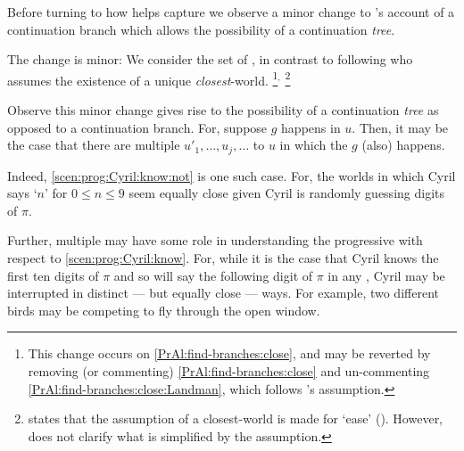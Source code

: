 \begin{note}
  Before turning to how \AlgFindBranches{} helps capture \drift{} we observe a minor change to \citeauthor{Landman:1992wh}'s account of a continuation branch which allows the possibility of a continuation \emph{tree}.

  The change is minor:
  We consider the set of , in contrast to following \citeauthor{Landman:1992wh} who assumes the existence of a unique \emph{closest}-world.%
  \footnote{
    This change occurs on \autoref{PrAl:find-branches:close}, and may be reverted by removing (or commenting) \autoref{PrAl:find-branches:close} and un-commenting \autoref{PrAl:find-branches:close:Landman}, which follows \citeauthor{Landman:1992wh}'s assumption.
  }\(^{,}\)%
  \footnote{
    \citeauthor{Landman:1992wh} states that the assumption of a closest-world is made for `ease' (\citeyear[26]{Landman:1992wh}).
    However, \citeauthor{Landman:1992wh} does not clarify what is simplified by the assumption.
  }

  Observe this minor change gives rise to the possibility of a continuation \emph{tree} as opposed to a continuation branch.
  For, suppose \(g\) happens in \(u\).
  Then, it may be the case that there are multiple  \(u'_{1},\dots,u_{j},\dots\) to \(u\) in which the \(g\) (also) happens.

  Indeed, \autoref{scen:prog:Cyril:know:not} is one such case.
  For, the worlds in which Cyril says `\(n\)' for \(0 \leq n \leq 9\) seem equally close given Cyril is randomly guessing digits of \(\pi\).

  Further, multiple  may have some role in understanding the progressive with respect to \autoref{scen:prog:Cyril:know}.
  For, while it is the case that Cyril knows the first ten digits of \(\pi\) and so will say the following digit of \(\pi\) in any , Cyril may be interrupted in distinct --- but equally close --- ways.
  For example, two different birds may be competing to fly through the open window.
\end{note}

